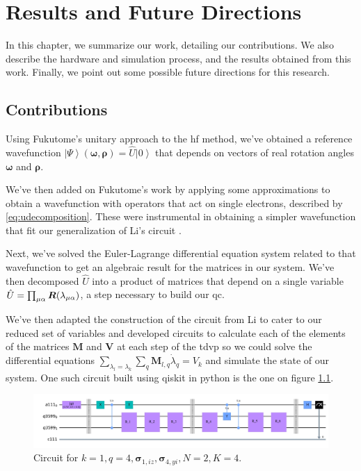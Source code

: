 \documentclass{aux/ttuthes2007}
\newcommand{\ket}[1]{\ensuremath{\left|#1\right\rangle}}
\newcommand{\elec}{N}
\newcommand{\orb}{K}
\newcommand{\ind}[1]{{\uo #1 \oo #1}}
\newcommand{\uo}[1]{
		\IfEqCase{#1}{
			{0}{\mu}
			{1}{\nu}
			{2}{\xi}
		}[\PackageError{uo}{Undefined option to uo: #1}{}]
}
\newcommand{\oo}[1]{
		\IfEqCase{#1}{
			{0}{\alpha}
			{1}{\beta}
			{2}{\gamma}
		}[\PackageError{unocorb}{Undefined option to unuo: #1}{}]
}
\begin{document}

\chapter{\textbf{Results and Future Directions}}\label{chap:results}

In this chapter, we summarize our work, detailing our contributions. We also describe the hardware and simulation process, and the results obtained from this work. Finally, we point out some possible future directions for this research.

\section{\textbf{Contributions}}
Using Fukutome's  unitary approach to the \gls{hf} method, we've obtained a reference wavefunction $\ket \Psi(\bm \omega, \bm \rho) = \hat U\ket 0$ that depends on vectors of real rotation angles $\bm \omega$ and $\bm \rho$. 

We've then added on Fukutome's work by applying some approximations to obtain a wavefunction with operators that act on single electrons, described by \ref{eq:udecomposition}. These were instrumental in obtaining a simpler wavefunction that fit our generalization of Li's circuit .

Next, we've solved the Euler-Lagrange differential equation system related to that wavefunction to get an algebraic result for the matrices in our system.
We've then decomposed $\hat U$ into a product of matrices that depend on a single variable $\hat U = \prod_{\ind 0} \bm R(\lambda_{\ind 0})$, a step necessary to build our \gls{qc}.

We've then adapted the construction of the circuit from Li  to cater to our reduced set of variables and developed circuits to calculate each of the elements of the matrices $\bm M$ and $\bm V$ at each step of the \gls{tdvp} so we could solve the differential equations $\sum_{\lambda_l = \lambda_k} \sum_q \bm M_{l,q}\dot{\lambda}_q = V_k$ and simulate the state of our system. One such circuit built using qiskit in python is the one on figure \ref{fig:circuit}. 
\begin{figure}[hb!]
  \includegraphics[width=\linewidth]{img/circuit.jpg}
  \caption{Circuit for $k = 1, q = 4, \bm \sigma_{1, iz}, \bm \sigma_{4, yi}, \elec = 2, \orb = 4$.}
  \label{fig:circuit}
\end{figure}
\end{document}

